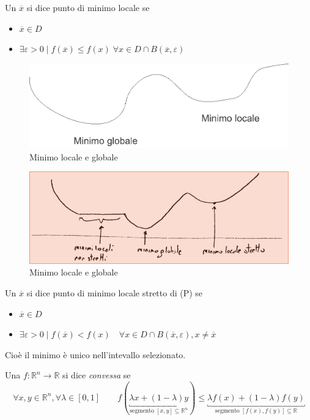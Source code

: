 \begin{defn}
 Un $\overline{x}$ si dice punto di minimo locale se
\begin{itemize}
 \item   $\overline{x} \in D$
 \item  $ \exists \varepsilon >0  \; | \; f(\overline{x}) \leq f(x) \; \forall x \in D \cap B(\overline{x}, \varepsilon)$
\end{itemize}
\end{defn}

\begin{figure}[h]
  \centerline{\includegraphics[scale=0.4]{imgs/img01.pdf}}
  \label{fig:theFi2}
  \caption{Minimo locale e globale}
\end{figure}

\begin{figure}[h]
  \centerline{\includegraphics[scale=0.4]{imgs/img02.jpg}}
  \label{fig:theFi2}
  \caption{Minimo locale e globale}
\end{figure}

\begin{defn}
 Un $\overline{x}$ si dice punto di minimo locale stretto
di (P) se 
\begin{itemize}
 \item   $\overline{x} \in D$
 \item  $ \exists \varepsilon >0  \; | \; f(\overline{x}) < f(x) \quad  \forall x 
\in D \cap B(\overline{x}, \varepsilon), x \neq \overline{x}$
\end{itemize}
\end{defn}
Cioè il minimo è unico nell'intevallo selezionato.
\begin{defn}
 Una $f: \mathbb{R}^n \rightarrow \mathbb{R}$ si dice \emph{convessa} se 
\begin{equation}
\label{richiamibigi:funzioneconvessa}
\forall x,y \in \mathbb{R}^{n}, \forall \lambda \in [0,1]
\qquad
f(\underbracket{\lambda x +(1-\lambda)y}_{\text{segmento } [x,y] \subseteq  \mathbb{R}^{n}}) \leq 
\underbracket{\lambda f(x) + (1-\lambda)f(y)}_{
\text{segmento } [f(x),f(y)] \subseteq \mathbb{R}
} 
\end{equation}
\end{defn}

